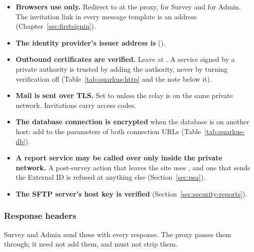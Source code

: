 \documentclass[11pt, a4paper]{article}
\begin{document}
\begin{itemize}
  \item \textbf{Browsers use  only.} Redirect  to  at the
        proxy, for Survey and for Admin. The invitation link in every message template is an
         address (Chapter~\ref{sec:firstsignin}).
  \item \textbf{The identity provider's issuer address is }
        ().
  \item \textbf{Outbound certificates are verified.} Leave  at
        . A service signed by a private authority is trusted by adding the authority,
        never by turning verification off (Table~\ref{tab:quarkus-http} and the note below it).
  \item \textbf{Mail is sent over TLS.} Set  to  unless the
        relay is on the same private network. Invitations carry access codes.
  \item \textbf{The database connection is encrypted} when the database is on another host:
        add  to the parameters of both connection URLs
        (Table~\ref{tab:quarkus-db}).
  \item \textbf{A report service may be called over  only inside the private
        network.} A post-survey action that leaves the site uses , and one that
        sends the External ID is refused at anything else (Section~\ref{sec:psa}).
  \item \textbf{The SFTP server's host key is verified}
        (Section~\ref{sec:security-reports}).
\end{itemize}

\subsubsection*{Response headers}

Survey and Admin send these with every response. The proxy passes them through; it need not
add them, and must not strip them.
\end{document}
